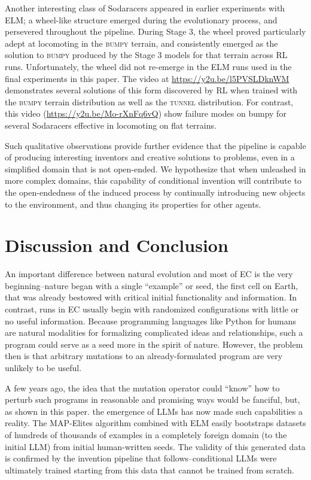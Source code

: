 \documentclass{article}
\begin{document}
Another interesting class of Sodaracers appeared in earlier experiments with ELM; a wheel-like structure emerged during the evolutionary process, and persevered throughout the pipeline. During Stage 3, the wheel proved particularly adept at locomoting in the \textsc{bumpy} terrain, and consistently emerged as the solution to \textsc{bumpy} produced by the Stage 3 models for that terrain across RL runs. Unfortunately, the wheel did not re-emerge in the ELM runs used in the final experiments in this paper. The video at \url{https://y2u.be/l5PVSLDknWM}  demonstrates several solutions of this form discovered by RL when trained with the \textsc{bumpy} terrain distribution as well as the \textsc{tunnel} distribution. For contrast, this video (\url{https://y2u.be/Mo-rXnFq6vQ})  show failure modes on bumpy for several Sodaracers effective in locomoting on flat terrains.

Such qualitative observations provide further evidence that the pipeline is capable of producing interesting inventors and creative solutions to problems, even in a simplified domain that is not open-ended. We hypothesize that when unleashed in more complex domains, this capability of conditional invention will contribute to the open-endedness of the induced process by continually introducing new objects to the environment, and thus changing its properties for other agents.

\section{Discussion and Conclusion}

An important difference between natural evolution and most of EC is the very beginning--nature began with a single ``example'' or seed, the first cell on Earth, that was already bestowed with critical initial functionality and information.  In contrast, runs in EC usually begin with randomized configurations with little or no useful information. 
Because programming languages like Python for humans are natural modalities for formalizing complicated ideas and relationships, such a program could serve as a seed more in the spirit of nature.  However, the problem then is that arbitrary mutations to an already-formulated program are very unlikely to be useful.  

A few years ago, the idea that the mutation operator could ``know'' how to perturb such programs in reasonable and promising ways would be fanciful, but, as shown in this paper. the emergence of LLMs has now made such capabilities a reality. The MAP-Elites algorithm combined with ELM easily bootstraps datasets of hundreds of thousands of examples in a completely foreign domain (to the initial LLM) from initial human-written seeds.  The validity of this generated data is confirmed by the invention pipeline that follows--conditional LLMs were ultimately trained starting from this data that cannot be trained from scratch.  
\end{document}
